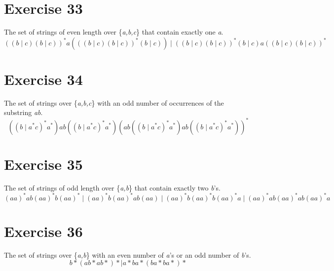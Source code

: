 \documentclass{report}
\begin{document}
\section*{Exercise 33}
The set of strings of even length over \{\textit{a,b,c}\} that contain exactly one \textit{a}.
\newline
$$((b \mid c)(b \mid c))^*a(((b \mid c)(b \mid c))^*(b \mid c))  \mid  ((b \mid c)(b \mid c))^*(b \mid c)a((b \mid c)(b \mid c))^*$$

\section*{Exercise 34}
The set of strings over \{\textit{a,b,c}\} with an odd number of occurrences of the substring \textit{ab}.
\newline
$$((b \mid a^*c)^*a^*) ab ((b \mid a^*c)^*a^*) ( ab ((b \mid a^*c)^*a^*) ab ((b \mid a^*c)^*a^*))^*$$

\section*{Exercise 35}
The set of strings of odd length over \{\textit{a,b}\} that contain exactly two \textit{b}'s.
\newline
$$(aa)^*ab(aa)^*b(aa)^*  \mid  (aa)^*b(aa)^*ab(aa)  \mid  (aa)^*b(aa)^*b(aa)^*a  \mid  (aa)^*ab(aa)^*ab(aa)^*a$$

\section*{Exercise 36}
The set of strings over \{\textit{a,b}\} with an even number of \textit{a}'s or an odd number of \textit{b}'s.
\newline
$$b*(ab*ab*)* \mid a*ba*(ba*ba*)*$$
\end{document}
